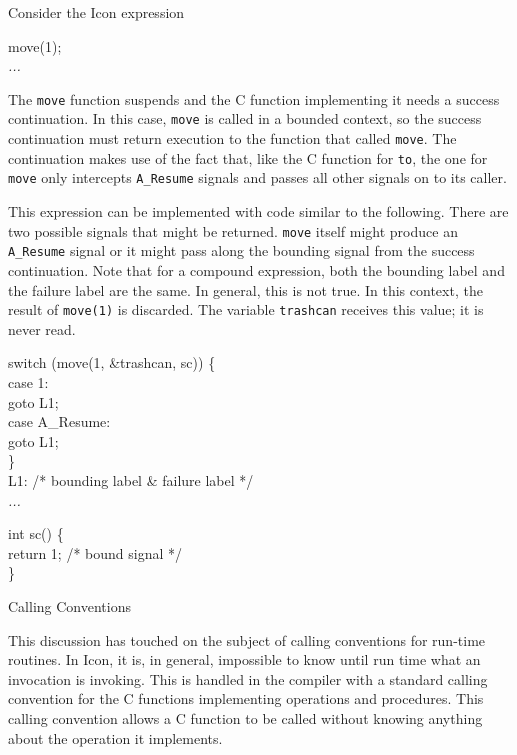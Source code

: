 Consider the Icon expression 

\goodbreak
\begin{iconcode}
move(1);\\
\>\textit{...}\\
\end{iconcode}

\noindent
The \texttt{move} function suspends and the C function implementing it
needs a success continuation. In this case, \texttt{move} is called in
a bounded context, so the success continuation must return execution
to the function that called \texttt{move}. The continuation makes use
of the fact that, like the C function for \texttt{to}, the one
for \texttt{move} only intercepts \texttt{A\_Resume} signals and
passes all other signals on to its caller.

This expression can be implemented with code similar to the
following. There are two possible signals that might be returned.
\texttt{move} itself might produce an \texttt{A\_Resume} signal or it
might pass along the bounding signal from the success continuation.
Note that for a compound expression, both the bounding label and the
failure label are the same. In general, this is not true. In this
context, the result of \texttt{move(1)} is discarded. The variable
\texttt{trashcan} receives this value; it is never read.

\goodbreak
\begin{iconcode}
\>switch (move(1, \&trashcan, sc)) \{\\
\>\>case 1:\\
\>\>\>goto L1;\\
\>\>case A\_Resume:\\
\>\>\>goto L1;\\
\>\}\\
L1: /* bounding label \& failure label */\\
\>\textit{...}\\
\end{iconcode}
\goodbreak
\begin{iconcode}
int sc() \{\\
\>return 1; /* bound signal */\\
\}\\
\end{iconcode}

\noindent
{\sffamily
Calling Conventions}


This discussion has touched on the subject of calling conventions for
run-time routines. In Icon, it is, in general, impossible to know
until run time what an invocation is invoking. This is handled in the
compiler with a standard calling convention for the C functions
implementing operations and procedures. This calling convention allows
a C function to be called without knowing anything about the operation
it implements.

